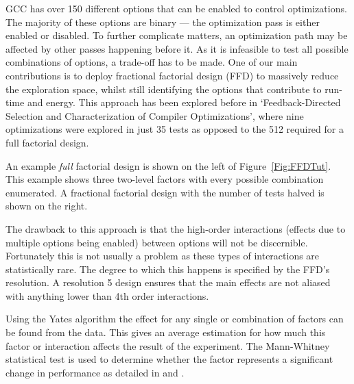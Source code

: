\documentclass[twocolumn]{article}
\begin{document}
GCC has over 150 different options that can be enabled to control optimizations. The majority of these options are binary --- the optimization pass is either enabled or disabled. To further complicate matters, an optimization path may be affected by other passes happening before it. As it is infeasible to test all possible combinations of options, a trade-off has to be made. One of our main contributions is to deploy fractional factorial design (FFD) to massively reduce the exploration space, whilst still identifying the options that contribute to run-time and energy. This approach has been explored before in `Feedback-Directed Selection and Characterization of Compiler Optimizations'\cite{IntelPaper}, where nine optimizations were explored in just 35 tests as opposed to the 512 required for a full factorial design.

An example \textit{full} factorial design is shown on the left of Figure~\ref{Fig:FFDTut}. This example shows three two-level factors with every possible combination enumerated. A fractional factorial design with the number of tests halved is shown on the right.

The drawback to this approach is that the high-order interactions (effects due to multiple options being enabled) between options will not be discernible. Fortunately this is not usually a problem as these types of interactions are statistically rare. The degree to which this happens is specified by the FFD's resolution. A resolution 5 design ensures that the main effects are not aliased with anything lower than 4th order interactions.

Using the Yates algorithm\cite{BoxHunter} the effect for any single or combination of factors can be found from the data. This gives an average estimation for how much this factor or interaction affects the result of the experiment. The Mann-Whitney statistical test is used to determine whether the factor represents a significant change in performance as detailed in \cite{EnergyReductionCompilerOptions} and \cite{Haneda2005}.
\end{document}
